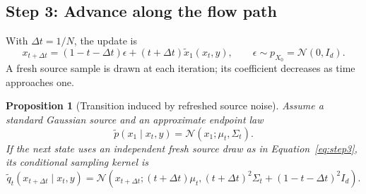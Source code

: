 \documentclass[11pt,a4paper]{article}
\newtheorem{proposition}{Proposition}
\newcommand{\Normal}{\mathcal{N}}
\newcommand{\Dx}{\Delta t}
\begin{document}
\subsection{Step 3: Advance along the flow path}
With $\Dx=1/N$, the update is
\begin{equation}
    x_{t+\Dx}
    =
    (1-t-\Dx)\epsilon
    +
    (t+\Dx)\widetilde x_1(x_t,y),
    \qquad
    \epsilon\sim p_{X_0}=\Normal(0,I_d).
    \label{eq:step3}
\end{equation}
A fresh source sample is drawn at each iteration;
its coefficient decreases as time approaches one.
\begin{proposition}[Transition induced by refreshed source noise]
Assume a standard Gaussian source and an approximate endpoint law
\begin{equation}
    \widetilde p(x_1\mid x_t,y)
    =
    \Normal(x_1;\mu_t,\Sigma_t).
\end{equation}
If the next state uses an independent fresh source draw as in
Equation~\eqref{eq:step3}, its conditional sampling kernel is
\begin{equation}
    \widetilde q_t(x_{t+\Dx}\mid x_t,y)
    =
    \Normal\left(
        x_{t+\Dx};
        (t+\Dx)\mu_t,
        (t+\Dx)^2\Sigma_t
        +
        (1-t-\Dx)^2I_d
    \right).
    \label{eq:prop3}
\end{equation}
\end{proposition}
\end{document}
